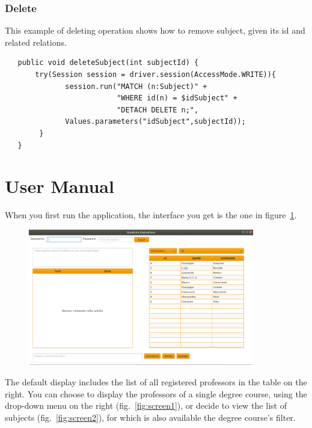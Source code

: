 \documentclass[a4paper]{article}
\begin{document}
\subsubsection{Delete}
This example of deleting operation shows how to remove subject, given its id and related relations.

\begin{verbatim}
   public void deleteSubject(int subjectId) {
       try(Session session = driver.session(AccessMode.WRITE)){
              session.run("MATCH (n:Subject)" +
                          "WHERE id(n) = $idSubject" +
                          "DETACH DELETE n;",
              Values.parameters("idSubject",subjectId));
        }
   }
\end{verbatim}
\clearpage
\section{User Manual}
When you first run the application, the interface you get is the one in figure~\ref{fig:screen0}. 

\begin{figure}[h]
\centering
\includegraphics[width=0.88\textwidth]{images/screens/screen0}
\label{fig:screen0}
\end{figure}

The default display includes the list of all registered professors in the table on the right. You can choose to display the professors of a single degree course, using the drop-down menu on the right (fig.~\ref{fig:screen1}), or decide to view the list of subjects (fig.~\ref{fig:screen2}), for which is also available the degree course's filter. 
\end{document}
